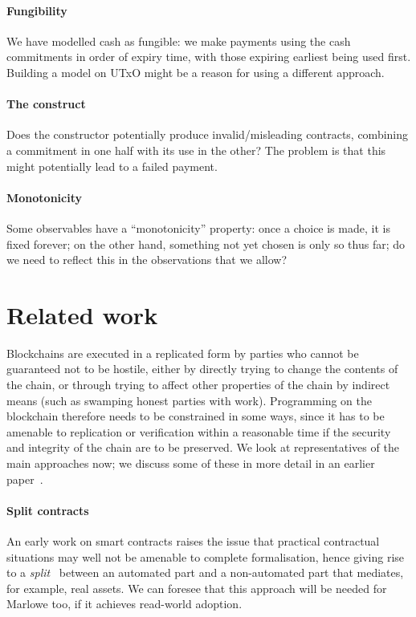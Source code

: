 \documentclass[runningheads]{llncs}
\begin{document}
{\paragraph{Fungibility}

We have modelled cash as fungible: we make payments using the cash commitments in order of expiry time, with those 
expiring earliest being used first. Building a model on UTxO might be a reason for using a different approach.


\paragraph{The  construct}

Does the  constructor potentially produce invalid/misleading contracts, combining a commitment in 
one half with its use in the other? The problem is that this might potentially lead to 
a failed payment. 

\paragraph{Monotonicity}

Some observables have a ``monotonicity'' property: once a choice is made, it is fixed forever; on the other hand, 
something not yet chosen is only so thus far; do we need to reflect this in the observations that we allow?

} %

\section{Related work}
\label{sec:related}

Blockchains are executed in a replicated form by parties who cannot be guaranteed not to be hostile, either by directly 
trying to change the contents of the chain, or through trying to affect other properties of the chain by indirect means 
(such as swamping honest parties with work). Programming on the blockchain therefore needs to be constrained in some 
ways, since it has to be amenable to replication or verification within a reasonable time if the security and integrity 
of the chain are to be preserved. We look at representatives of the main approaches now; we discuss some of these in 
more detail in an earlier paper~\cite{cryptoeprint:2016:1156}.

\paragraph{Split contracts}
An early work on smart contracts raises the issue that practical contractual situations may well not be amenable to 
complete formalisation, hence giving rise to a \emph{split}~\cite{split-contracts} between an automated part and a 
non-automated part that mediates, for example, real assets. We can foresee that this approach will be needed for Marlowe 
too, if it achieves read-world adoption.
\end{document}
